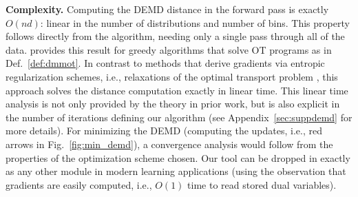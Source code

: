 {\bf Complexity.} Computing the DEMD distance in the forward pass is exactly $O(nd)$: linear in the number of distributions and number of bins. This property follows directly from the algorithm, needing only a single pass through all of the data. \cite{BEIN199597} provides this result for greedy algorithms that solve OT programs as in Def.~\ref{def:dmmot}. {\color{blue}  In contrast to methods that derive gradients via entropic regularization schemes, i.e., relaxations of the optimal transport problem \citep{diffpropsinkwass,difftopkOT,quantnorm}, this approach solves the distance computation exactly in linear time.}
This linear time analysis is not only provided by the theory in prior work, but is also explicit in the number of iterations defining our algorithm (see Appendix~\ref{sec:suppdemd} for more details).
For minimizing the DEMD {\color{blue}(computing the updates, i.e., red arrows in Fig.~\ref{fig:min_demd})}, a convergence analysis would follow from the properties of the optimization scheme chosen. Our tool can be dropped in exactly as any other module in modern learning applications (using the observation that gradients are easily computed, i.e., $O(1)$ time to read stored dual variables). %






